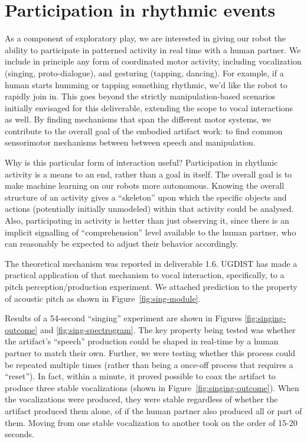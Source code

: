 \section{Participation in rhythmic events}

As a component of exploratory play, we are interested in giving our
robot the ability to participate in patterned activity in real time
with a human partner.  We include in principle any form of
coordinated motor activity, including vocalization
(singing, proto-dialogue), and gesturing (tapping, dancing).
%
For example, if a human starts humming or tapping something rhythmic, 
we'd like the robot to rapidly join in.
%
This goes beyond the strictly manipulation-based scenarios initially
envisaged for this deliverable, extending the scope to vocal interactions
as well.  By finding mechanisms that span the different motor systems,
we contribute to the overall goal of the embodied artifact work: to
find common sensorimotor mechanisms between between speech and 
manipulation.


Why is this particular form of interaction
useful?  Participation in rhythmic activity is a means to
an end, rather than a goal in itself.  The overall goal is to make
machine learning on our robots more autonomous.
%
Knowing the overall structure of an activity gives a ``skeleton'' upon
which the specific objects and actions (potentially initially
unmodeled) within that activity could be analysed.
%
Also, participating in activity is better than just observing it,
since there is an implicit signalling of ``comprehension'' level
available to the human partner, who can reasonably be expected to
adjust their behavior accordingly.


The theoretical mechanism was reported in deliverable 1.6.  
UGDIST has made a practical application of that mechanism to
vocal interaction, specifically, to a pitch perception/production
experiment.  We attached prediction to the property of acoustic pitch
as shown in Figure~\ref{fig:sing-module}.


Results of a 54-second ``singing'' experiment are shown in 
Figures \ref{fig:singing-outcome} and \ref{fig:sing-spectrogram}. 
%
The key property being tested was whether the artifact's 
``speech'' production could be shaped in real-time by
a human partner to match their own.
%
Further, we were testing whether this process could be
repeated multiple times (rather than being a once-off
process that requires a ``reset'').
%
In fact, within a minute, it proved possible to
coax the artifact to produce three stable vocalizations
(shown in Figure~\ref{fig:singing-outcome}).
%
When the vocalizations were produced, they were stable
regardless of whether the artifact produced them alone,
of if the human partner also produced all or part of them.
%
Moving from one stable vocalization to another 
took on the order of 15-20 seconds.

